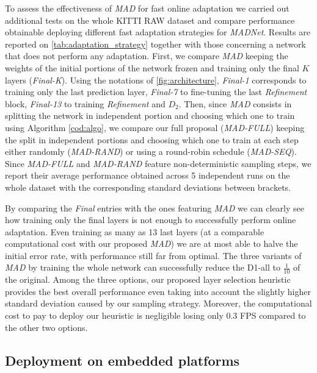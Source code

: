 \documentclass[10pt,twocolumn,letterpaper]{article}
\def\netname{\emph{MADNet}}
\def\algoname{\emph{MAD}}
\def\kitti{KITTI}
\begin{document}
To assess the effectiveness of \algoname{} for fast online adaptation we carried out additional tests on the whole \kitti{} RAW dataset \cite{KITTI_RAW} and compare performance obtainable deploying different fast adaptation strategies for \netname{}. Results are reported on \autoref{tab:adaptation_strategy} together with those concerning a network that does not perform any adaptation. First, we compare \algoname{} keeping the weights of the initial portions of the network frozen and training only the final $K$ layers (\textit{Final-K}). Using the notations of \autoref{fig:architecture}, \textit{Final-1} corresponds to training only the last prediction layer, \textit{Final-7} to fine-tuning the last \textit{Refinement} block, \textit{Final-13} to training \textit{Refinement} and \textit{$D_2$}.  Then, since \algoname{} consists in splitting the network in independent portion and choosing which one to train using Algorithm \autoref{cod:algo}, we compare our full proposal (\textit{\algoname{}-FULL}) keeping the split in independent portions and choosing which one to train at each step either randomly (\textit{\algoname{}-RAND}) or using a round-robin schedule (\textit{\algoname{}-SEQ}). Since \textit{\algoname{}-FULL} and \textit{\algoname{}-RAND} feature non-deterministic sampling steps, we report their average performance obtained across 5 independent runs on the whole dataset with the corresponding standard deviations between brackets.

By comparing the \textit{Final} entries with the ones featuring \algoname{} we can clearly see how training only the final layers is not enough to successfully perform online adaptation. Even training as many as 13 last layers (at a comparable computational cost with our proposed \algoname{}) we are at most able to halve the initial error rate, with performance still far from optimal. The three variants of \algoname{} by training the whole network can successfully reduce the D1-all to $\frac{1}{10}$ of the original. Among the three options, our proposed layer selection heuristic provides the best overall performance even taking into account the slightly higher standard deviation caused by our sampling strategy. Moreover, the computational cost to pay to deploy our heuristic is negligible losing only $0.3$ FPS compared to the other two options.

\subsection{Deployment on embedded platforms}
\label{ssec:mobile}
\end{document}
